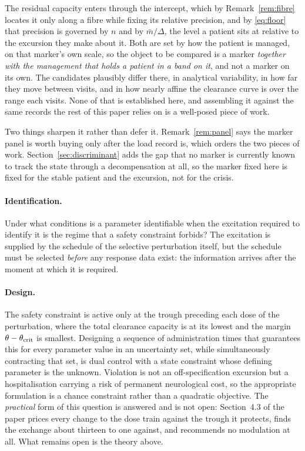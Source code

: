 The residual capacity enters through the intercept, which by Remark~\ref{rem:fibre} locates
it only along a fibre while fixing its relative precision, and by \eqref{eq:floor} that
precision is governed by $n$ and by $\bar m/\Delta$, the level a patient sits at relative to
the excursion they make about it. Both are set by how the patient is managed, on that
marker's own scale, so the object to be compared is a marker \emph{together with the
management that holds a patient in a band on it}, and not a marker on its own. The
candidates plausibly differ there, in analytical variability, in how far they move between
visits, and in how nearly affine the clearance curve is over the range each visits. None of
that is established here, and assembling it against the same records the rest of this paper
relies on is a well-posed piece of work.

Two things sharpen it rather than defer it. Remark~\ref{rem:panel} says the marker panel is
worth buying only after the load record is, which orders the two pieces of work.
Section~\ref{sec:discriminant} adds the gap that no marker is currently known to track the
state through a decompensation at all, so the marker fixed here is fixed for the stable
patient and the excursion, not for the crisis.

\paragraph{Identification.} Under what conditions is a parameter identifiable when the
excitation required to identify it is the regime that a safety constraint forbids? The
excitation is supplied by the schedule of the selective perturbation itself, but the
schedule must be selected \emph{before} any response data exist: the information arrives
after the moment at which it is required.

\paragraph{Design.} The safety constraint is active only at the trough preceding each dose
of the perturbation, where the total clearance capacity is at its lowest and the margin
$\theta - \theta_{\mathrm{crit}}$ is smallest. Designing a sequence of administration times that guarantees
this for every parameter value in an uncertainty set, while simultaneously contracting that
set, is dual control with a state constraint whose defining parameter is the unknown.
Violation is not an off-specification excursion but a hospitalisation carrying a risk of
permanent neurological cost, so the appropriate formulation is a chance constraint rather
than a quadratic objective. The \emph{practical} form of this question is
answered and is not open: Section~4.3 of the paper prices every change to the dose train
against the trough it protects, finds the exchange about thirteen to one against, and
recommends no modulation at all. What remains open is the theory above.

